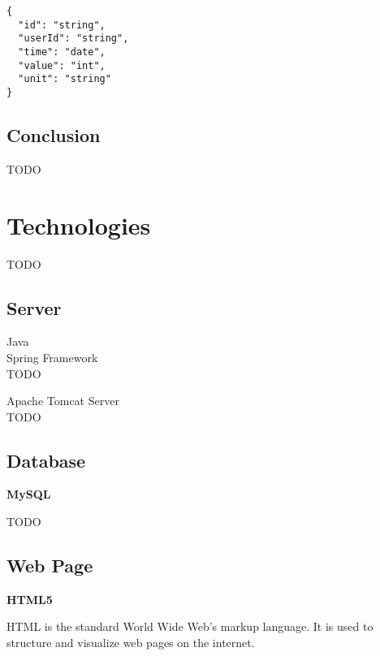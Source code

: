 \begin{verbatim}
{
  "id": "string",
  "userId": "string",
  "time": "date",
  "value": "int",
  "unit": "string"
}
\end{verbatim}

\subsection{Conclusion}

TODO


\section{Technologies}

TODO

\subsection{Server}

Java \\
Spring Framework \\
TODO

Apache Tomcat Server \\ 
TODO

\subsection{Database}

\textbf{MySQL}

TODO

\subsection{Web Page}

\textbf{HTML5}

HTML is the standard World Wide Web's markup language.
It is used to structure and visualize web pages on the internet.

